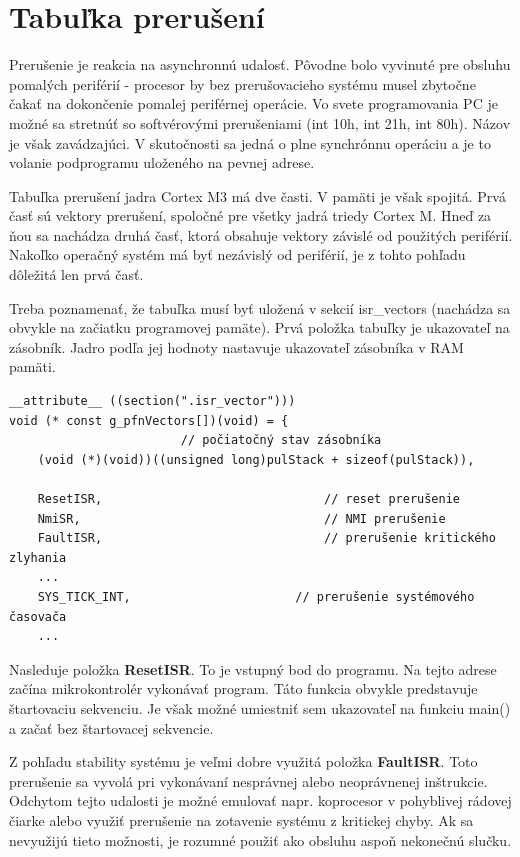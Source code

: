 \section{Tabuľka prerušení}

Prerušenie je reakcia na asynchronnú udalosť. Pôvodne bolo vyvinuté pre obsluhu pomalých periférií - procesor by bez prerušovacieho systému musel zbytočne čakať na dokončenie pomalej periférnej operácie. Vo svete programovania PC je možné sa stretnúť so softvérovými prerušeniami (int 10h, int 21h, int 80h). Názov je však zavádzajúci. V skutočnosti sa jedná o plne synchrónnu operáciu a je to volanie podprogramu uloženého na pevnej adrese.

Tabuľka prerušení jadra Cortex M3 má dve časti. V pamäti je však spojitá. Prvá časť sú vektory prerušení, spoločné pre všetky jadrá triedy Cortex M. Hneď za ňou sa nachádza druhá časť, ktorá obsahuje vektory závislé od použitých periférií. Nakoľko operačný systém má byť nezávislý od periférií, je z tohto pohľadu dôležitá len prvá časť. 

Treba poznamenať, že tabuľka musí byť uložená v sekcií isr\_vectors (nachádza sa obvykle na začiatku programovej pamäte). Prvá položka tabuľky je ukazovateľ na zásobník. Jadro podľa jej hodnoty nastavuje ukazovateľ zásobníka v RAM pamäti.


{\small
\begin{verbatim}
__attribute__ ((section(".isr_vector")))
void (* const g_pfnVectors[])(void) = {
					    // počiatočný stav zásobníka
    (void (*)(void))((unsigned long)pulStack + sizeof(pulStack)),
                                            
    ResetISR,                               // reset prerušenie
    NmiSR,                                  // NMI prerušenie
    FaultISR,                               // prerušenie kritického zlyhania
    ...
    SYS_TICK_INT,        	            // prerušenie systémového časovača
    ...
\end{verbatim}
}

Nasleduje položka \textbf{ResetISR}. To je vstupný bod do programu. Na tejto adrese začína mikrokontrolér vykonávať program. Táto funkcia obvykle predstavuje štartovaciu sekvenciu. Je však možné umiestniť sem ukazovateľ na funkciu main() a začať bez štartovacej sekvencie.

Z pohľadu stability systému je veľmi dobre využitá položka \textbf{FaultISR}. Toto prerušenie sa vyvolá pri vykonávaní nesprávnej alebo neoprávnenej inštrukcie. Odchytom tejto udalosti je možné emulovať napr. koprocesor v pohyblivej rádovej čiarke alebo využiť prerušenie na zotavenie systému z kritickej chyby. Ak sa nevyužijú tieto možnosti, je rozumné použiť ako obsluhu aspoň nekonečnú slučku.

